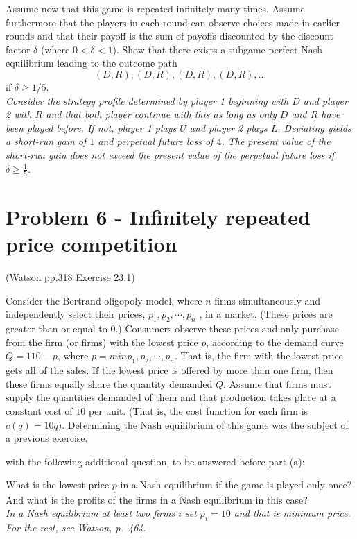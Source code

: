 \documentclass{article}
\begin{document}
Assume now that this game is repeated infinitely many times. Assume furthermore that the players in each round can observe choices made in earlier rounds and that their payoff is the sum of payoffs discounted by the discount factor   $\delta$ (where $0 < \delta < 1$). Show that there exists a subgame perfect Nash equilibrium leading to the outcome path
$$(D, R), (D, R), (D, R), (D, R), \dots $$
if $\delta \geq 1/5$. \\ \textit{Consider the strategy profile determined by player 1 beginning with $D$ and player 2 with $R$ and that both player continue with this as long as only $D$ and $R$ have been played before. If not, player 1 plays $U$ and player 2 plays $L$. Deviating yields a short-run gain of $1$ and perpetual future loss of $4$. The present value of the short-run gain does not exceed the present value of the perpetual future loss if $\delta \geq \tfrac15$.}




\section{Problem 6 - Infinitely repeated price competition}

(Watson pp.318 Exercise 23.1)


Consider the Bertrand oligopoly model, where $n$ firms simultaneously and independently
select their prices, $p_1 , p_2 , \cdots , p_n$ , in a market. (These prices are
greater than or equal to $0$.) Consumers observe these prices and only purchase
from the firm (or firms) with the lowest price $p$, according to the demand
curve $Q = 110 − p$, where $p = min{p_1 , p_2 , \cdots , p_n}$. That is, the firm with
the lowest price gets all of the sales. If the lowest price is offered by more than
one firm, then these firms equally share the quantity demanded $Q$. Assume
that firms must supply the quantities demanded of them and that production
takes place at a constant cost of $10$ per unit. (That is, the cost function for each
firm is $c (q) = 10q)$. Determining the Nash equilibrium of this game was the
subject of a previous exercise.






with the following additional question, to be answered before part (a):

What is the lowest price $\underline{p}$ in a Nash equilibrium if the game is played only once?
And what is the profits of the firms in a Nash equilibrium in this case? \\ \textit{In a Nash equilibrium at least two firms $i$ set $p_i = 10$ and that is minimum price. For the rest, see Watson, p.~464.}
\end{document}
